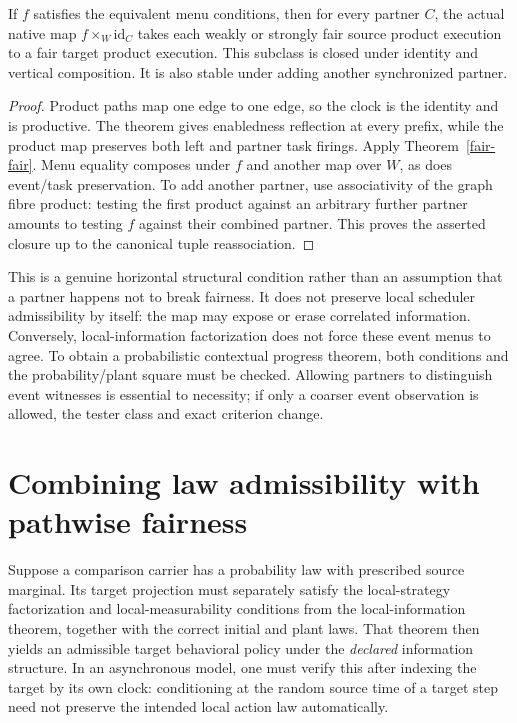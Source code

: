 \documentclass[11pt]{article}
\begin{document}
\begin{proposition}
If $f$ satisfies the equivalent menu conditions, then for every partner $C$, the actual native map $f\times_W\mathrm{id}_C$ takes each weakly or strongly fair source product execution to a fair target product execution. This subclass is closed under identity and vertical composition. It is also stable under adding another synchronized partner.
\end{proposition}
\begin{proof}
Product paths map one edge to one edge, so the clock is the identity and is productive. The theorem gives enabledness reflection at every prefix, while the product map preserves both left and partner task firings. Apply Theorem~\ref{fair-fair}. Menu equality composes under $f$ and another map over $W$, as does event/task preservation. To add another partner, use associativity of the graph fibre product: testing the first product against an arbitrary further partner amounts to testing $f$ against their combined partner. This proves the asserted closure up to the canonical tuple reassociation.
\end{proof}

This is a genuine horizontal structural condition rather than an assumption that a partner happens not to break fairness. It does not preserve local scheduler admissibility by itself: the map may expose or erase correlated information. Conversely, local-information factorization does not force these event menus to agree. To obtain a probabilistic contextual progress theorem, both conditions and the probability/plant square must be checked. Allowing partners to distinguish event witnesses is essential to necessity; if only a coarser event observation is allowed, the tester class and exact criterion change.

\section{Combining law admissibility with pathwise fairness}
Suppose a comparison carrier has a probability law with prescribed source marginal. Its target projection must separately satisfy the local-strategy factorization and local-measurability conditions from the local-information theorem, together with the correct initial and plant laws. That theorem then yields an admissible target behavioral policy under the \emph{declared} information structure. In an asynchronous model, one must verify this after indexing the target by its own clock: conditioning at the random source time of a target step need not preserve the intended local action law automatically.
\end{document}
